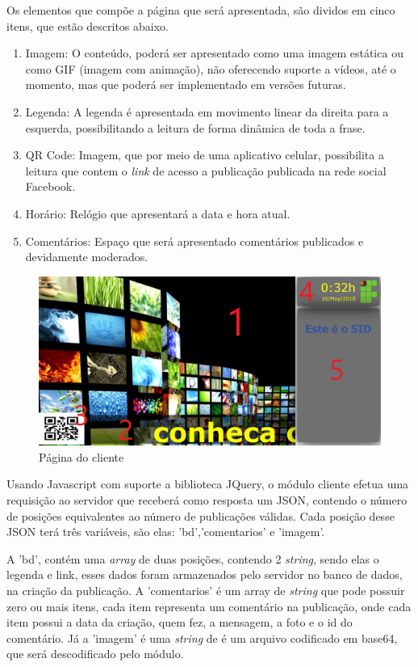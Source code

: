 Os elementos que compõe a página que será apresentada, são dividos em cinco itens, que estão descritos abaixo.

\begin{enumerate}
   \item Imagem: O conteúdo, poderá ser apresentado como uma imagem estática ou como GIF (imagem com animação), não oferecendo suporte a vídeos, até o momento, mas que poderá ser implementado em versões futuras. 
   \item Legenda: A legenda é apresentada em movimento linear da direita para a esquerda, possibilitando a leitura de forma dinâmica de toda a frase.
   \item QR Code: Imagem, que por meio de uma aplicativo celular, possibilita a leitura que contem o \textit{link} de acesso a publicação publicada na rede social Facebook.
   \item Horário: Relógio que apresentará a data e hora atual.  
   \item Comentários: Espaço que será apresentado comentários publicados e devidamente moderados.
 \end{enumerate}
  
\begin{figure}[H]
\centering
\includegraphics[scale=0.3]{figuras/cliente1}
\caption{Página do cliente}
\label{fig:cliente1}
\end{figure}

Usando Javascript com suporte a biblioteca JQuery, o módulo cliente efetua uma requisição ao servidor que receberá como resposta um JSON, contendo o número de posições equivalentes ao número de publicações válidas. Cada posição desse JSON terá três variáveis, são elas: 'bd','comentarios' e 'imagem'. 

A 'bd', contém uma \textit{array} de duas posições, contendo 2 \textit{string}, sendo elas o legenda e link, esses dados foram armazenados pelo servidor no banco de dados, na criação da publicação. A 'comentarios' é um array de \textit{string} que pode possuir zero ou mais itens, cada item representa um comentário na publicação, onde cada item possui a data da criação, quem fez, a mensagem, a foto e o id do comentário. Já a 'imagem' é uma \textit{string} de é um arquivo codificado em base64, que será descodificado pelo módulo.

